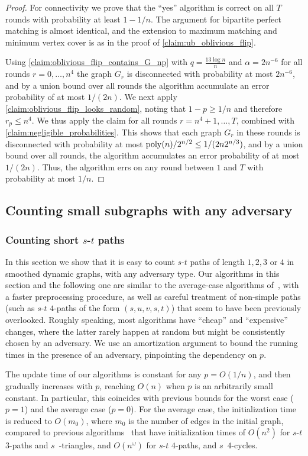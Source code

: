 \documentclass[letter,11pt]{article}
\newcommand{\st}{$s$-$t$\xspace}
\newcommand{\paths}[3]{${#1}$-${#2}$ ${#3}$-paths\xspace}
\begin{document}
\begin{proof}
    For connectivity we prove that the ``yes'' algorithm is correct on all $T$ rounds with probability at least $1-1/n$. 
    The argument for bipartite perfect matching is almost identical,
    and the extension to maximum matching 
    and minimum vertex cover is as in the proof of \cref{claim:ub_oblivious_flip}.
    
    Using \cref{claim:oblivious_flip_contains_G_np} with $q = \frac{13\log n}{n}$ and $\alpha = 2n^{-6}$
    for all rounds $r = 0 ,\dots, n^4$ the graph $G_r$ is disconnected with probability at most $2n^{-6}$, and by a union bound over all rounds the algorithm accumulate an error probability of at most $1/(2n)$.
    We next apply \cref{claim:oblivious_flip_looks_random}, noting that $1-p \geq 1/n$ and therefore $r_p \leq n^4$. We thus apply the claim for all rounds $r=n^4+1, \dots, T$, combined with \cref{claim:negligible_probabilities}. This shows that each graph $G_r$ in these rounds is disconnected with probability at most $\operatorname{poly}(n) / 2^{n/2} \leq 1/(2n 2^{n/3})$, and by a union bound over all rounds, the algorithm accumulates an error probability of at most $1/(2n)$.
    Thus, the algorithm errs on any round between $1$ and $T$ with probability at most $1/n$.
\end{proof}


\subsection{Counting small subgraphs with any adversary}
\subsubsection{Counting short \st paths}
In this section we show that it is easy to count \st paths of length $1,2,3$ or $4$ in smoothed dynamic graphs,
with any adversary type.
Our algorithms in this section and the following one are similar to the average-case algorithms of~\cite{HLS22}, 
with a faster preprocessing procedure, as well as careful treatment of non-simple paths (such as \paths st4 of the form $(s,u,v,s,t)$) that
seem to have been previously overlooked.
Roughly speaking,
most algorithms have ``cheap'' and ``expensive'' changes, 
where the latter rarely happen at random but might be consistently chosen by an adversary.
We use an amortization argument
to bound the running times in the presence of an adversary, pinpointing the dependency on $p$.

The update time of our algorithms is constant for any $p = O(1/n)$, and then gradually increases with $p$, reaching $O(n)$ when $p$ is an arbitrarily small constant.
In particular, this coincides with previous bounds for the worst case ($p=1$) and the average case ($p=0$).
For the average case, the initialization time is reduced to $O(m_0)$, where $m_0$ is the number of edges in the initial graph,
compared to previous algorithms~\cite{HLS22} that have initialization times of $O(n^2)$ for \paths st3 and $s$~-triangles, and $O(n^\omega)$ for \paths st4,  and $s$~$4$-cycles.
\end{document}
